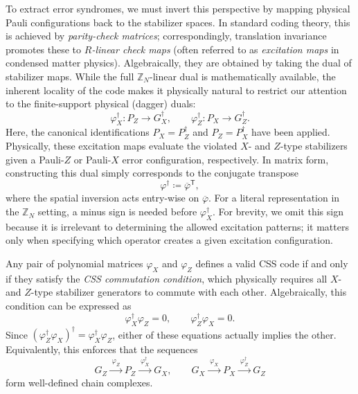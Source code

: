 \documentclass[aps,prx,english,superscriptaddress,twocolumn,tightenlines,showpacs,longbibliography,floatfix,amsfonts]{revtex4-2}
\theoremstyle{remark}
\theoremstyle{definition}
\begin{document}
To extract error syndromes, we must invert this perspective by mapping physical Pauli configurations back to the stabilizer spaces. In standard coding theory, this is achieved by \emph{parity-check matrices}; correspondingly, translation invariance promotes these to \emph{\(R\)-linear check maps} (often referred to as \emph{excitation maps} in condensed matter physics). Algebraically, they are obtained by taking the dual of stabilizer maps. While the full \(\mathbb{Z}_N\)-linear dual is mathematically available, the inherent locality of the code makes it physically natural to restrict our attention to the finite-support physical (dagger) duals:
\begin{equation}
	\varphi_X^\dagger: P_Z \to G_X^\dagger, \qquad \varphi_Z^\dagger: P_X \to G_Z^\dagger.
\end{equation}
Here, the canonical identifications \(P_X = P_Z^\dagger\) and \(P_Z = P_X^\dagger\) have been applied. Physically, these excitation maps evaluate the violated \(X\)- and \(Z\)-type stabilizers given a Pauli-\(Z\) or Pauli-\(X\) error configuration, respectively. In matrix form, constructing this dual simply corresponds to the conjugate transpose
\begin{equation}
	\varphi^\dagger \coloneqq \overline{\varphi}^{\mathsf{T}}, \label{eq:dual_map}
\end{equation}
where the spatial inversion acts entry-wise on $\overline{\varphi}$.
	For a literal representation in the \(\mathbb{Z}_N\) setting, a minus sign is needed before \(\varphi_X^\dagger\).
For brevity, we omit this sign because it is irrelevant to determining the allowed excitation patterns; it matters only when specifying which operator creates a given excitation configuration.




Any pair of polynomial matrices \(\varphi_X\) and \(\varphi_Z\) defines a valid CSS code if and only if they satisfy the \emph{CSS commutation condition}, which physically requires all \(X\)- and \(Z\)-type stabilizer generators to commute with each other.
Algebraically, this condition can be expressed as
\begin{equation}
	\varphi_X^\dagger\varphi_Z=0,
	\qquad
	\varphi_Z^\dagger\varphi_X=0.
\end{equation}
Since $(\varphi_Z^\dagger\varphi_X)^\dagger = \varphi_X^\dagger\varphi_Z$, either of these equations actually implies the other. Equivalently, this enforces that the sequences
\begin{equation}
	G_Z\xrightarrow{\;\varphi_Z\;}P_Z
	\xrightarrow{\;\varphi_X^\dagger\;}G_X,
	\qquad
	G_X\xrightarrow{\;\varphi_X\;}P_X
	\xrightarrow{\;\varphi_Z^\dagger\;}G_Z
	\label{eq:CSS-two-complexes}
\end{equation}
form well-defined chain complexes.
\end{document}
